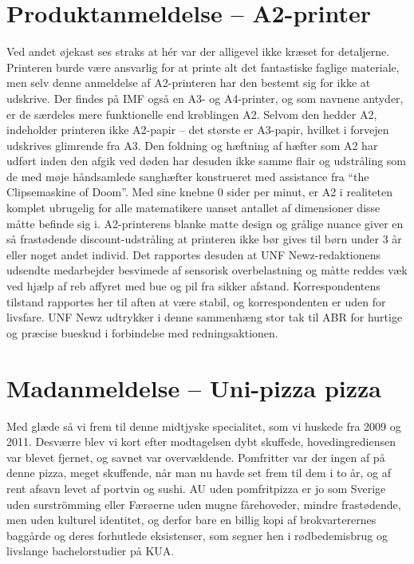 \begin{minipage}[b]{0.95\linewidth}
\begin{minipage}[t]{0.47\textwidth}
\section*{Produktanmeldelse -- A2-printer}
Ved andet øjekast ses straks at hér var der alligevel ikke kræset for detaljerne. Printeren burde være ansvarlig for at printe alt det fantastiske faglige materiale, men selv denne anmeldelse af A2-printeren har den bestemt sig for ikke at udskrive. Der findes på IMF også en A3- og A4-printer, og som navnene antyder, er de særdeles mere funktionelle end krøblingen A2. Selvom den hedder A2, indeholder printeren ikke A2-papir -- det største er A3-papir, hvilket i forvejen udskrives glimrende fra A3. Den foldning og hæftning af hæfter som A2 har udført inden den afgik ved døden har desuden ikke samme flair og udstråling som de med møje håndsamlede sanghæfter konstrueret med assistance fra ``the Clipsemaskine of Doom''.
Med sine knebne 0 sider per minut, er A2 i realiteten komplet ubrugelig for alle matematikere uanset antallet af dimensioner disse måtte befinde sig i. A2-printerens blanke matte design og grålige nuance giver en så frastødende discount-udstråling at printeren ikke bør gives til børn under 3 år eller noget andet individ. Det rapportes desuden at UNF Newz-redaktionens udsendte medarbejder besvimede af sensorisk overbelastning og måtte reddes væk ved hjælp af reb affyret med bue og pil fra sikker afstand. Korrespondentens tilstand rapportes her til aften at være stabil, og korrespondenten er uden for livsfare. UNF Newz udtrykker i denne sammenhæng stor tak til ABR for hurtige og præcise bueskud i forbindelse med redningsaktionen.

\vspace{1mm}
\section*{Madanmeldelse -- Uni-pizza pizza}

\vspace{2mm}

Med glæde så vi frem til denne midtjyske specialitet, som vi huskede fra 2009 og 2011. Desværre blev vi kort efter modtagelsen dybt skuffede, hovedingrediensen var blevet fjernet, og savnet var overvældende. Pomfritter var der ingen af på denne pizza, meget skuffende, når man nu havde set frem til dem i to år, og af rent afsavn levet af portvin og sushi. AU uden pomfritpizza er jo som Sverige uden surströmming eller Færøerne uden mugne fårehoveder, mindre frastødende, men uden kulturel identitet, og derfor bare en billig kopi af brokvarterernes baggårde og deres forhutlede eksistenser, som segner hen i rødbedemisbrug og livslange bachelorstudier på KUA. 

\end{minipage}
\end{minipage}
